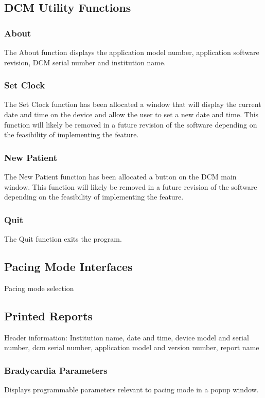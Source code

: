\documentclass[12pt]{article}
\begin{document}
\subsection{DCM Utility Functions}
\subsubsection{About}
The About function displays the application model number, application software revision, DCM serial number and institution name.

\subsubsection{Set Clock}
The Set Clock function has been allocated a window that will display the current date and time on the device and allow the user to set a new date and time. This function will likely be removed in a future revision of the software depending on the feasibility of implementing the feature.

\subsubsection{New Patient}
The New Patient function has been allocated a button on the DCM main window. This function will likely be removed in a future revision of the software depending on the feasibility of implementing the feature.

\subsubsection{Quit}
The Quit function exits the program.

\subsection{Pacing Mode Interfaces}
Pacing mode selection

\subsection{Printed Reports}
Header information: Institution name, date and time, device model and serial number, dcm serial number, application model and version number, report name
\subsubsection{Bradycardia Parameters}
Displays programmable parameters relevant to pacing mode in a popup window.
\end{document}
